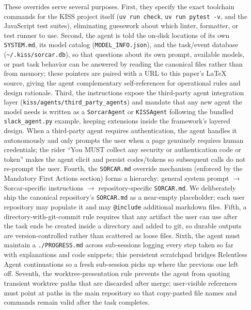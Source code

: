 \documentclass{article}
\begin{document}
These overrides serve several purposes.  First, they specify the exact toolchain commands for the KISS project itself (\texttt{uv run check}, \texttt{uv run pytest -v}, and the JavaScript test suites), eliminating guesswork about which linter, formatter, or test runner to use.  Second, the agent is told the on-disk locations of its own \texttt{SYSTEM.md}, its model catalog (\texttt{MODEL\_INFO.json}), and the task/event database (\texttt{\textasciitilde/.kiss/sorcar.db}), so that questions about its own prompt, available models, or past task behavior can be answered by reading the canonical files rather than from memory; these pointers are paired with a URL to this paper's \LaTeX{} source, giving the agent complementary self-references for operational rules and design rationale.  Third, the instructions expose the third-party agent integration layer (\texttt{kiss/agents/third\_party\_agents}) and mandate that any new agent the model needs is written as a \texttt{SorcarAgent} or \texttt{KISSAgent} following the bundled \texttt{slack\_agent.py} example, keeping extensions inside the framework's layered design.  When a third-party agent requires authentication, the agent handles it autonomously and only prompts the user when a page genuinely requires human credentials; the rider ``You MUST collect any security or authentication code or token'' makes the agent elicit and persist codes/tokens so subsequent calls do not re-prompt the user.  Fourth, the \texttt{SORCAR.md} override mechanism (enforced by the Mandatory First Actions section) forms a hierarchy: general system prompt $\rightarrow$ Sorcar-specific instructions $\rightarrow$ repository-specific \texttt{SORCAR.md}.  We deliberately ship the canonical repository's \texttt{SORCAR.md} as a near-empty placeholder; each user repository may populate it and may \texttt{@include} additional markdown files.  Fifth, a directory-with-git-commit rule requires that any artifact the user can use after the task ends be created inside a directory and added to git, so durable outputs are version-controlled rather than scattered as loose files.  Sixth, the agent must maintain a \texttt{./PROGRESS.md} across sub-sessions logging every step taken so far with explanations and code snippets; this persistent scratchpad bridges Relentless Agent continuations so a fresh sub-session picks up where the previous one left off.  Seventh, the worktree-presentation rule prevents the agent from quoting transient worktree paths that are discarded after merge; user-visible references must point at paths in the main repository so that copy-pasted file names and commands remain valid after the task completes.
\end{document}

